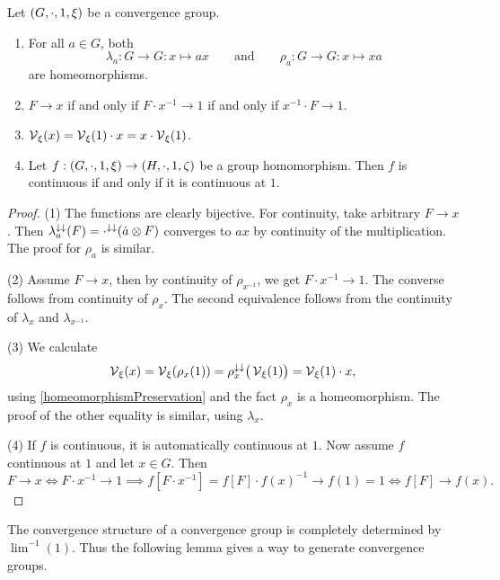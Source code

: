 \begin{lemma} \label{shiftHomeomorphism}
Let $\sSet{G,\cdot, 1, \xi}$ be a convergence group.
\begin{enumerate}
\item For all $a\in G$, both
\[ \lambda_a: G\to G: x\mapsto ax \qquad\text{and}\qquad \rho_a: G\to G: x\mapsto xa \]
are homeomorphisms.
\item $F \to x$ \textup{if and only if} $F\cdot x^{-1} \to 1$ \textup{if and only if} $x^{-1}\cdot F\to 1$.
\item $\operatorname{\mathcal{V}}_\xi(x) = \operatorname{\mathcal{V}}_\xi(1) \cdot x = x\cdot \operatorname{\mathcal{V}}_\xi(1)$.
\item Let $f: \sSet{G,\cdot, 1, \xi} \to \sSet{H,\cdot, 1, \zeta}$ be a group homomorphism. Then $f$ is continuous \textup{if and only if} it is continuous at $1$.
\end{enumerate}
\end{lemma}
\begin{proof}
(1) The functions are clearly bijective. For continuity, take arbitrary $F\to x$. Then $\lambda_a^{\downarrow\downarrow}(F) = \cdot^{\downarrow\downarrow}(\dot{a}\otimes F)$ converges to $ax$ by continuity of the multiplication. The proof for $\rho_a$ is similar.

(2) Assume $F\to x$, then by continuity of $\rho_{x^{-1}}$, we get $F\cdot x^{-1} \to 1$. The converse follows from continuity of $\rho_x$. The second equivalence follows from the continuity of $\lambda_{x}$ and $\lambda_{x^{-1}}$.

(3) We calculate
\[ \operatorname{\mathcal{V}}_\xi(x) = \operatorname{\mathcal{V}}_\xi(\rho_x(1)) = \rho_x^{\downarrow\downarrow}\big(\operatorname{\mathcal{V}}_\xi(1)\big) = \operatorname{\mathcal{V}}_\xi(1) \cdot x, \]
using \ref{homeomorphismPreservation} and the fact $\rho_x$ is a homeomorphism. The proof of the other equality is similar, using $\lambda_x$.

(4) If $f$ is continuous, it is automatically continuous at $1$. Now assume $f$ continuous at $1$ and let $x\in G$. Then
\[ F\to x \iff F\cdot x^{-1} \to 1 \implies f[F\cdot x^{-1}] = f[F]\cdot f(x)^{-1} \to f(1) = 1 \iff f[F] \to f(x). \]
\end{proof}

The convergence structure of a convergence group is completely determined by $\lim^{-1}(1)$. Thus the following lemma gives a way to generate convergence groups.

